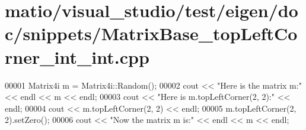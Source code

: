 \hypertarget{matio_2visual__studio_2test_2eigen_2doc_2snippets_2_matrix_base__top_left_corner__int__int_8cpp_source}{}\section{matio/visual\+\_\+studio/test/eigen/doc/snippets/\+Matrix\+Base\+\_\+top\+Left\+Corner\+\_\+int\+\_\+int.cpp}
\label{matio_2visual__studio_2test_2eigen_2doc_2snippets_2_matrix_base__top_left_corner__int__int_8cpp_source}

\begin{DoxyCode}
00001 Matrix4i m = Matrix4i::Random();
00002 cout << \textcolor{stringliteral}{"Here is the matrix m:"} << endl << m << endl;
00003 cout << \textcolor{stringliteral}{"Here is m.topLeftCorner(2, 2):"} << endl;
00004 cout << m.topLeftCorner(2, 2) << endl;
00005 m.topLeftCorner(2, 2).setZero();
00006 cout << \textcolor{stringliteral}{"Now the matrix m is:"} << endl << m << endl;
\end{DoxyCode}
